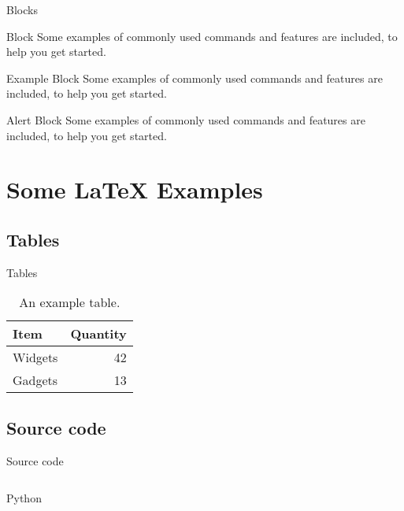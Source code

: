 \documentclass[10pt,compress]{beamer} %
\begin{document}
\begin{frame}{Blocks}

\begin{block}{Block}
Some examples of commonly used commands and features are included, to help you get started.
\end{block}

\begin{exampleblock}{Example Block}
Some examples of commonly used commands and features are included, to help you get started.
\end{exampleblock}

\begin{alertblock}{Alert Block}
Some examples of commonly used commands and features are included, to help you get started.
\end{alertblock}

\end{frame}

\section{Some \LaTeX{} Examples}
\subsection{Tables}

\begin{frame}{Tables}

\begin{table}
\centering
\begin{tabular}{l|r}
Item & Quantity \\\hline
Widgets & 42 \\
Gadgets & 13
\end{tabular}
\caption{\label{tab:widgets}An example table.}
\end{table}

\end{frame}

\subsection{Source code}

\begin{frame}{Source code}
    \begin{columns}
	        \begin{block}{Python}
	        \vspace{-0.2cm}
		        
            \end{block}
		    
    \end{columns}
\end{frame}
\end{document}
